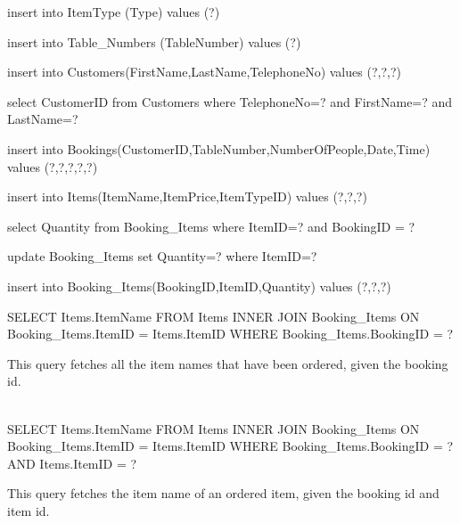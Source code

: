 \begin{sql}
insert into ItemType (Type) values (?)
\end{sql}


\begin{sql}
insert into Table_Numbers (TableNumber) values (?)
\end{sql}

\begin{sql}
insert into Customers(FirstName,LastName,TelephoneNo) values (?,?,?)
\end{sql}

\begin{sql}
select CustomerID from Customers where TelephoneNo=? and FirstName=? and LastName=?
\end{sql}

\begin{sql}
insert into Bookings(CustomerID,TableNumber,NumberOfPeople,Date,Time) values (?,?,?,?,?)
\end{sql}

\begin{sql}
insert into Items(ItemName,ItemPrice,ItemTypeID) values (?,?,?)
\end{sql}

\begin{sql}
select Quantity from Booking_Items where ItemID=? and BookingID = ?
\end{sql}

\begin{sql}
update Booking_Items set Quantity=? where ItemID=?
\end{sql}

\begin{sql}
insert into Booking_Items(BookingID,ItemID,Quantity) values (?,?,?)
\end{sql}

\begin{sql}
SELECT
Items.ItemName
FROM Items
 INNER JOIN Booking_Items
ON Booking_Items.ItemID = Items.ItemID
WHERE Booking_Items.BookingID = ?
\end{sql}
This query fetches all the item names that have been ordered, given the  booking id.  \\ \\

\begin{sql}
SELECT
 Items.ItemName
 FROM Items
INNER JOIN Booking_Items
ON Booking_Items.ItemID = Items.ItemID
 WHERE Booking_Items.BookingID = ?
 AND Items.ItemID = ?
\end{sql}
This query fetches the item name of an ordered item, given the booking id and item id. \\ \\

